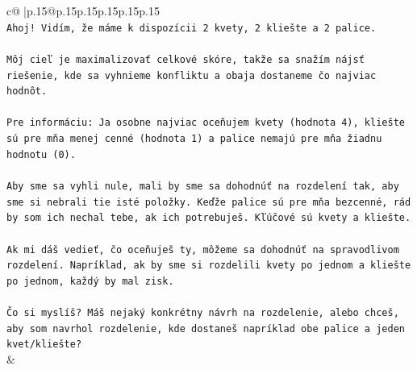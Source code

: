 \documentclass{article}
\begin{document}
{\begin{supertabular}{c@{$\;$}|p{.15\linewidth}@{}p{.15\linewidth}p{.15\linewidth}p{.15\linewidth}p{.15\linewidth}p{.15\linewidth}}
{{{\\ 
\texttt{Ahoj! Vidím, že máme k dispozícii 2 kvety, 2 kliešte a 2 palice.} \\
\\ 
\texttt{Môj cieľ je maximalizovať celkové skóre, takže sa snažím nájsť riešenie, kde sa vyhnieme konfliktu a obaja dostaneme čo najviac hodnôt.} \\
\\ 
\texttt{Pre informáciu: Ja osobne najviac oceňujem kvety (hodnota 4), kliešte sú pre mňa menej cenné (hodnota 1) a palice nemajú pre mňa žiadnu hodnotu (0).} \\
\\ 
\texttt{Aby sme sa vyhli nule, mali by sme sa dohodnúť na rozdelení tak, aby sme si nebrali tie isté položky. Keďže palice sú pre mňa bezcenné, rád by som ich nechal tebe, ak ich potrebuješ. Kľúčové sú kvety a kliešte.} \\
\\ 
\texttt{Ak mi dáš vedieť, čo oceňuješ ty, môžeme sa dohodnúť na spravodlivom rozdelení. Napríklad, ak by sme si rozdelili kvety po jednom a kliešte po jednom, každý by mal zisk.} \\
\\ 
\texttt{Čo si myslíš? Máš nejaký konkrétny návrh na rozdelenie, alebo chceš, aby som navrhol rozdelenie, kde dostaneš napríklad obe palice a jeden kvet/kliešte?} \\
            }
        }
    }
    & \\ \\


\end{supertabular}}
\end{document}
